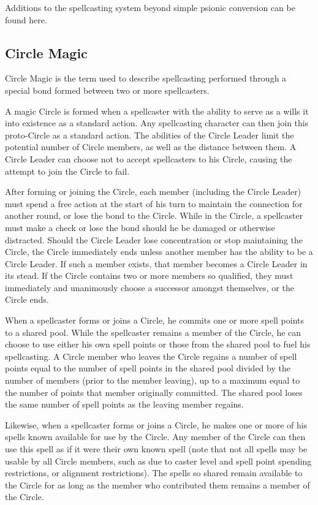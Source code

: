 Additions to the spellcasting system beyond simple psionic conversion can be found here.
\subsection{Circle Magic}
\label{sec:CircleMagic}
Circle Magic is the term used to describe spellcasting performed through a special bond formed between two or more spellcasters.

A magic Circle is formed when a spellcaster with the ability to serve as a  wills it into existence as a standard action. Any spellcasting character can then join this proto-Circle as a standard action. The abilities of the Circle Leader limit the potential number of Circle members, as well as the distance between them. A Circle Leader can choose not to accept spellcasters to his Circle, causing the attempt to join the Circle to fail.

After forming or joining the Circle, each member (including the Circle Leader) must spend a free action at the start of his turn to maintain the connection for another round, or lose the bond to the Circle. While in the Circle, a spellcaster must make a  check or lose the bond should he be damaged or otherwise distracted.
Should the Circle Leader lose concentration or stop maintaining the Circle, the Circle immediately ends unless another member has the ability to be a Circle Leader. If such a member exists, that member becomes a Circle Leader in its stead. If the Circle contains two or more members so qualified, they must immediately and unanimously choose a successor amongst themselves, or the Circle ends.

When a spellcaster forms or joins a Circle, he commits one or more spell points to a shared pool. While the spellcaster remains a member of the Circle, he can choose to use either his own spell points or those from the shared pool to fuel his spellcasting.
A Circle member who leaves the Circle regains a number of spell points equal to the number of spell points in the shared pool divided by the number of members (prior to the member leaving), up to a maximum equal to the number of points that member originally committed. The shared pool loses the same number of spell points as the leaving member regains.

Likewise, when a spellcaster forms or joins a Circle, he makes one or more of his spells known available for use by the Circle. Any member of the Circle can then use this spell as if it were their own known spell (note that not all spells may be usable by all Circle members, such as due to caster level and spell point spending restrictions, or alignment restrictions). The spells so shared remain available to the Circle for as long as the member who contributed them remains a member of the Circle.
